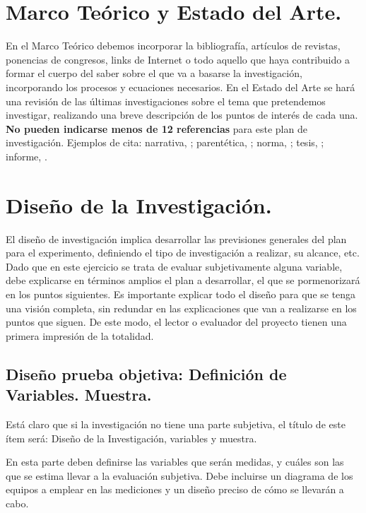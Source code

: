 \documentclass[biblatex]{untref-plan}
\begin{document}
\section{Marco Teórico y Estado del Arte.}

En el Marco Teórico debemos incorporar la bibliografía, artículos de revistas, ponencias de congresos, links de Internet o todo aquello que haya contribuido a formar el cuerpo del saber sobre el que va a basarse la investigación, incorporando los procesos y ecuaciones necesarios. En el Estado del Arte se hará una revisión de las últimas investigaciones sobre el tema que pretendemos investigar, realizando una breve descripción de los puntos de interés de cada una. \textbf{No pueden indicarse menos de 12 referencias} para este plan de investigación. Ejemplos de cita: narrativa, \textcite{ejemplo-articulo}; parentética, \parencite{ejemplo-libro}; norma, \parencite{ejemplo-norma}; tesis, \parencite{ejemplo-tesis}; informe, \parencite{ejemplo-informe}.

\section{Diseño de la Investigación.}

El diseño de investigación implica desarrollar las previsiones generales del plan para el experimento, definiendo el tipo de investigación a realizar, su alcance, etc. Dado que en este ejercicio se trata de evaluar subjetivamente alguna variable, debe explicarse en términos amplios el plan a desarrollar, el que se pormenorizará en los puntos siguientes. Es importante explicar todo el diseño para que se tenga una visión completa, sin redundar en las explicaciones que van a realizarse en los puntos que siguen. De este modo, el lector o evaluador del proyecto tienen una primera impresión de la totalidad.

\subsection{Diseño prueba objetiva: Definición de Variables. Muestra.}

Está claro que si la investigación no tiene una parte subjetiva, el título de este ítem será: Diseño de la Investigación, variables y muestra.

En esta parte deben definirse las variables que serán medidas, y cuáles son las que se estima llevar a la evaluación subjetiva. Debe incluirse un diagrama de los equipos a emplear en las mediciones y un diseño preciso de cómo se llevarán a cabo.
\end{document}
